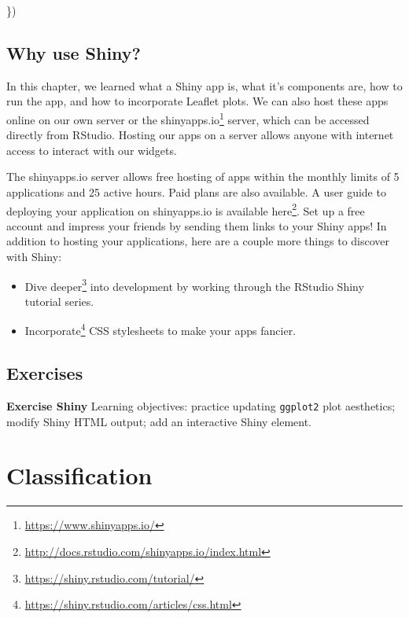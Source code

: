 \documentclass[
]{krantz}
\makeatletter
\newenvironment{Shaded}{\begin{snugshade}}{\end{snugshade}}
\newcommand{\NormalTok}[1]{#1}
\providecommand{\tightlist}{%
  \setlength{\itemsep}{0pt}\setlength{\parskip}{0pt}}
\renewcommand{\href}[2]{#2\footnote{\url{#1}}}
\newenvironment{kframe}{%
\medskip{}
\setlength{\fboxsep}{.8em}
 \def\at@end@of@kframe{}%
 \ifinner\ifhmode%
  \def\at@end@of@kframe{\end{minipage}}%
  \begin{minipage}{\columnwidth}%
 \fi\fi%
 \def\FrameCommand##1{\hskip\@totalleftmargin \hskip-\fboxsep
 \colorbox{shadecolor}{##1}\hskip-\fboxsep
     \hskip-\linewidth \hskip-\@totalleftmargin \hskip\columnwidth}%
 \MakeFramed {\advance\hsize-\width
   \@totalleftmargin\z@ \linewidth\hsize
   \@setminipage}}%
 {\par\unskip\endMakeFramed%
 \at@end@of@kframe}
\renewenvironment{Shaded}{\begin{kframe}}{\end{kframe}}
\makeatother
\begin{document}
\begin{Shaded}
\begin{Highlighting}[]
\NormalTok{  \})}
\end{Highlighting}
\end{Shaded}

\hypertarget{why-use-shiny}{%
\section{Why use Shiny?}\label{why-use-shiny}}

In this chapter, we learned what a Shiny app is, what it's components are, how to run the app, and how to incorporate Leaflet plots. We can also host these apps online on our own server or the \href{https://www.shinyapps.io/}{shinyapps.io} server, which can be accessed directly from RStudio. Hosting our apps on a server allows anyone with internet access to interact with our widgets.

The shinyapps.io server allows free hosting of apps within the monthly limits of 5 applications and 25 active hours. Paid plans are also available. A user guide to deploying your application on shinyapps.io is available \href{http://docs.rstudio.com/shinyapps.io/index.html}{here}. Set up a free account and impress your friends by sending them links to your Shiny apps! In addition to hosting your applications, here are a couple more things to discover with Shiny:

\begin{itemize}
\tightlist
\item
  \href{https://shiny.rstudio.com/tutorial/}{Dive deeper} into development by working through the RStudio Shiny tutorial series.
\item
  \href{https://shiny.rstudio.com/articles/css.html}{Incorporate} CSS stylesheets to make your apps fancier.
\end{itemize}

\hypertarget{exercises-6}{%
\section{Exercises}\label{exercises-6}}

\textbf{Exercise Shiny} Learning objectives: practice updating \texttt{ggplot2} plot aesthetics; modify Shiny HTML output; add an interactive Shiny element.

\hypertarget{classification}{%
\chapter{Classification}\label{classification}}
\end{document}
